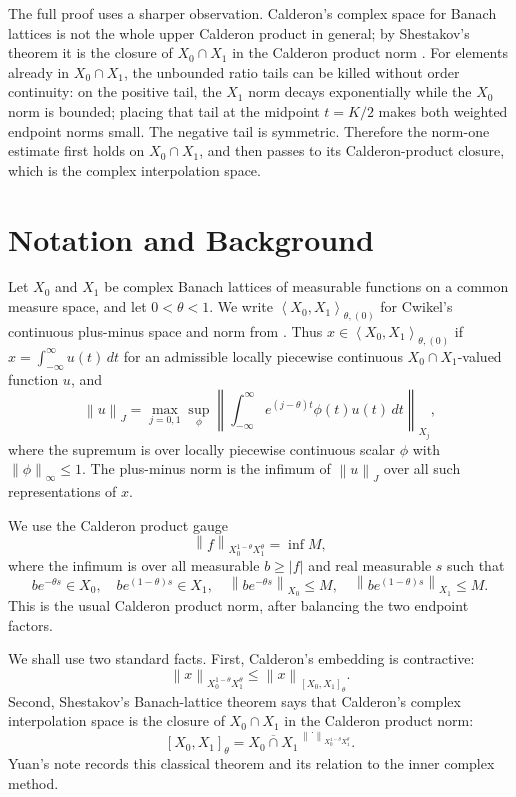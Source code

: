 \documentclass[11pt]{article}
\newcommand{\PM}{\left\langle X_0,X_1\right\rangle_{\theta,(0)}}
\newcommand{\Cplx}{\left[X_0,X_1\right]_\theta}
\newcommand{\Cal}{X_0^{1-\theta}X_1^\theta}
\newcommand{\norm}[1]{\left\lVert #1\right\rVert}
\begin{document}
The full proof uses a sharper observation.  Calderon's complex space for
Banach lattices is not the whole upper Calderon product in general; by
Shestakov's theorem it is the closure of $X_0\cap X_1$ in the Calderon
product norm \cite{Shestakov1974,Yuan2014}.  For elements already in
$X_0\cap X_1$, the unbounded ratio tails can be killed without order
continuity: on the positive tail, the $X_1$ norm decays exponentially
while the $X_0$ norm is bounded; placing that tail at the midpoint
$t=K/2$ makes both weighted endpoint norms small.  The negative tail is
symmetric.  Therefore the norm-one estimate first holds on
$X_0\cap X_1$, and then passes to its Calderon-product closure, which is
the complex interpolation space.

\section*{Notation and Background}

Let $X_0$ and $X_1$ be complex Banach lattices of measurable functions
on a common measure space, and let $0<\theta<1$.  We write
$\PM$ for Cwikel's continuous plus-minus space and norm from
\cite[Section 3]{Cwikel2015}.  Thus $x\in\PM$ if
$x=\int_{-\infty}^{\infty}u(t)\,dt$ for an admissible locally piecewise
continuous $X_0\cap X_1$-valued function $u$, and
\[
\norm{u}_{J}
=\max_{j=0,1}\sup_{\phi}
\left\|\int_{-\infty}^{\infty} e^{(j-\theta)t}\phi(t)u(t)\,dt
\right\|_{X_j},
\]
where the supremum is over locally piecewise continuous scalar
$\phi$ with $\norm{\phi}_\infty\le 1$.  The plus-minus norm is the
infimum of $\norm{u}_J$ over all such representations of $x$.

We use the Calderon product gauge
\[
\norm{f}_{\Cal}
=\inf M,
\]
where the infimum is over all measurable $b\ge |f|$ and real measurable
$s$ such that
\[
 b e^{-\theta s}\in X_0,\quad
 b e^{(1-\theta)s}\in X_1,\quad
 \norm{b e^{-\theta s}}_{X_0}\le M,\quad
 \norm{b e^{(1-\theta)s}}_{X_1}\le M .
\]
This is the usual Calderon product norm, after balancing the two
endpoint factors.

We shall use two standard facts.  First, Calderon's embedding is
contractive:
\[
\norm{x}_{\Cal}\le \norm{x}_{\Cplx}.
\]
Second, Shestakov's Banach-lattice theorem says that Calderon's complex
interpolation space is the closure of $X_0\cap X_1$ in the Calderon
product norm:
\[
\Cplx=\overline{X_0\cap X_1}^{\ \norm{\cdot}_{\Cal}}.
\]
Yuan's note \cite[p. 2]{Yuan2014} records this classical theorem and
its relation to the inner complex method.
\end{document}
